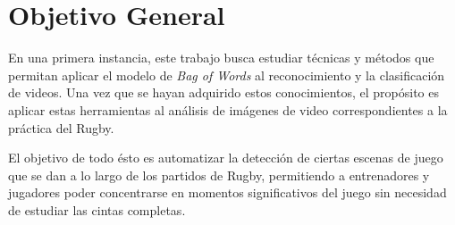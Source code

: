 \section{Objetivo General}
\iffalse
Explique el problema o situación de referencia en el que se desarrolla la
propuesta o los interrogantes en el campo disciplinario a los que la propuesta se
dirige. Desarrolle la importancia e impacto de los objetivos y el conocimiento
que se generará. En esta sección no es necesario describir las tareas específicas
que se realizarán (para eso, ver Objetivos específicos).
\fi
En una primera instancia, este trabajo busca estudiar técnicas y métodos que permitan aplicar el modelo de \textit{Bag of Words}
al reconocimiento y la clasificación de videos. 
Una vez que se hayan adquirido estos conocimientos, el propósito es aplicar estas herramientas al análisis de imágenes de video correspondientes a la
práctica del Rugby.

El objetivo de todo ésto es automatizar la detección de ciertas escenas de juego que se dan a lo largo de los partidos de Rugby, permitiendo a entrenadores
y jugadores poder concentrarse en momentos significativos del juego sin necesidad de estudiar las cintas completas.